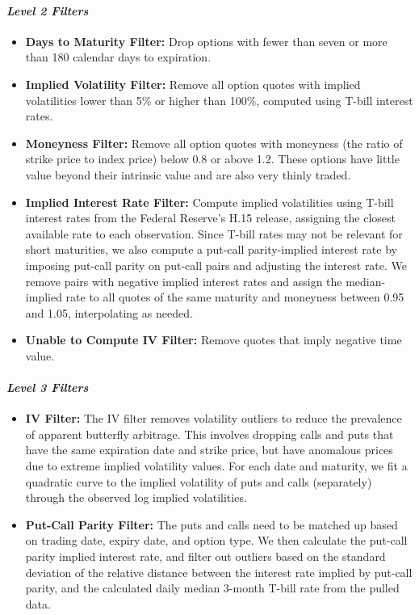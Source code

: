 \documentclass{article}
\begin{document}
\begin{appendices}
\paragraph{\textit{Level 2 Filters}}
\begin{itemize}
  \item \textbf{Days to Maturity Filter:} Drop options with fewer than seven or more than 180 calendar days to expiration.
  \item \textbf{Implied Volatility Filter:} Remove all option quotes with implied volatilities lower than 5\% or higher than 100\%, computed using T-bill interest rates.
  \item \textbf{Moneyness Filter:} Remove all option quotes with moneyness (the ratio of strike price to index price) below 0.8 or above 1.2. These options have little value beyond their intrinsic value and are also very thinly traded.
  \item \textbf{Implied Interest Rate Filter:} Compute implied volatilities using T-bill interest rates from the Federal Reserve's H.15 release, assigning the closest available rate to each observation. Since T-bill rates may not be relevant for short maturities, we also compute a put-call parity-implied interest rate by imposing put-call parity on put-call pairs and adjusting the interest rate. We remove pairs with negative implied interest rates and assign the median-implied rate to all quotes of the same maturity and moneyness between 0.95 and 1.05, interpolating as needed.
  \item \textbf{Unable to Compute IV Filter:} Remove quotes that imply negative time value.
\end{itemize}

\paragraph{\textit{Level 3 Filters}}
\begin{itemize}
  \item \textbf{IV Filter:} The IV filter removes volatility outliers to reduce the prevalence of apparent butterfly arbitrage. This involves dropping calls and puts that have the same expiration date and strike price, but have anomalous prices due to extreme implied volatility values. For each date and maturity, we fit a quadratic curve to the implied volatility of puts and calls (separately) through the observed log implied volatilities.
  \item \textbf{Put-Call Parity Filter:} The puts and calls need to be matched up based on trading date, expiry date, and option type. We then calculate the put-call parity implied interest rate, and filter out outliers based on the standard deviation of the relative distance between the interest rate implied by put-call parity, and the calculated daily median 3-month T-bill rate from the pulled data.
\end{itemize}



\end{appendices}
\end{document}
